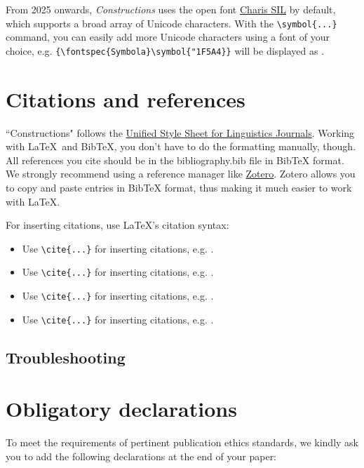 From 2025 onwards, \textit{Constructions} uses the open font \href{https://software.sil.org/charis/}{Charis SIL} by default, which supports a broad array of Unicode characters. With the \verb!\symbol{...}! command, you can easily add more Unicode characters using a font of your choice, e.g. \verb!{\fontspec{Symbola}\symbol{"1F5A4}}! will be displayed as {}. 

\section{Citations and references}

``Constructions" follows the \href{https://www.linguisticsociety.org/resource/unified-style-sheet}{Unified Style Sheet for Linguistics Journals}. Working with \LaTeX \  and BibTeX, you don't have to do the formatting manually, though. All references you cite should be in the bibliography.bib file in BibTeX format. We strongly recommend using a reference manager like \href{https://www.zotero.org/}{Zotero}. Zotero allows you to copy and paste entries in BibTeX format, thus making it much easier to work with \LaTeX. 

For inserting citations, use \LaTeX's citation syntax:

\begin{itemize}
    \item Use \verb!\cite{...}! for inserting citations, e.g. \cite{Example1}.
    \item Use \verb!\cite{...}! for inserting citations, e.g. \cite{Example2}.
    \item Use \verb!\cite{...}! for inserting citations, e.g. \cite{Example3}.
    \item Use \verb!\cite{...}! for inserting citations, e.g. \cite{iadc}.
\end{itemize}

\subsection*{Troubleshooting}


\section*{Obligatory declarations}

To meet the requirements of pertinent publication ethics standards, we kindly ask you to add the following declarations at the end of your paper:

